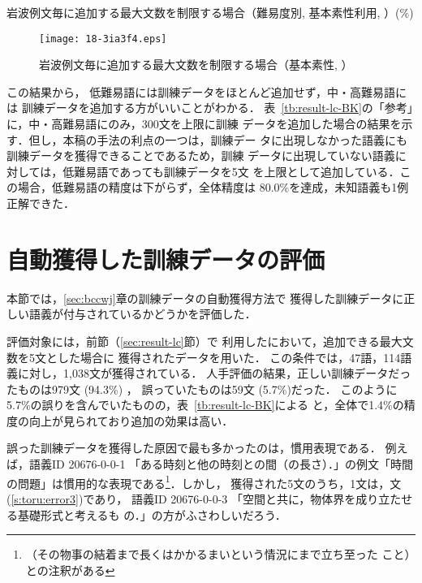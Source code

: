 \documentclass[japanese]{jnlp_1.4}
\newcommand{\BK}{}
\begin{document}
\begin{table}[t]
\caption{岩波例文毎に追加する最大文数を制限する場合（難易度別, 基本素性利用, \BK）(\%)} 
\label{tb:result-lc-BK}

\end{table}
\begin{figure}[t]
\begin{center}
\texttt{[image: 18-3ia3f4.eps]}
\end{center}
\caption{岩波例文毎に追加する最大文数を制限する場合（基本素性, \BK）}
\label{fig:result-lc-BK}
\end{figure}

この結果から，
低難易語には訓練データをほとんど追加せず，中・高難易語には
訓練データを追加する方がいいことがわかる．
表~\ref{tb:result-lc-BK}の「参考」に，中・高難易語にのみ，300文を上限に訓練
データを追加した場合の結果を示す．但し，本稿の手法の利点の一つは，訓練デー
タに出現しなかった語義にも訓練データを獲得できることであるため，訓練
データに出現していない語義に対しては，低難易語であっても訓練データを5文
を上限として追加している．この場合，低難易語の精度は下がらず，全体精度は
80.0\%を達成，未知語義も1例正解できた．




\section{自動獲得した訓練データの評価} 
\label{sec:eva-addex}


本節では，\ref{sec:bccwj}章の訓練データの自動獲得方法で
獲得した訓練データに正しい語義が付与されているかどうかを評価した．

評価対象には，前節（\ref{sec:result-lc}節）で
利用した\BK{}において，追加できる最大文数を5文とした場合に
獲得されたデータを用いた．
この条件では，47語，114語義に対し，1,038文が獲得されている．
人手評価の結果，正しい訓練データだったものは979文 (94.3\%) ，
誤っていたものは59文 (5.7\%)だった．
このように5.7\%の誤りを含んでいたものの，表~\ref{tb:result-lc-BK}による
と，全体で1.4\%の精度の向上が見られており追加の効果は高い．


誤った訓練データを獲得した原因で最も多かったのは，慣用表現である．
例えば，語義ID 20676-0-0-1 「ある時刻と他の時刻との間（の長さ）．」の例文「時間の問題」は慣用的な表現である\footnote{（その物事の結着まで長くはかかるまいという情況にまで立ち至った
こと）との注釈がある}．しかし，
獲得された5文のうち，1文は，文(\ref{s:toru:error3})であり，
語義ID 20676-0-0-3 「空間と共に，物体界を成り立たせる基礎形式と考えるも
の．」の方がふさわしいだろう．
\end{document}
